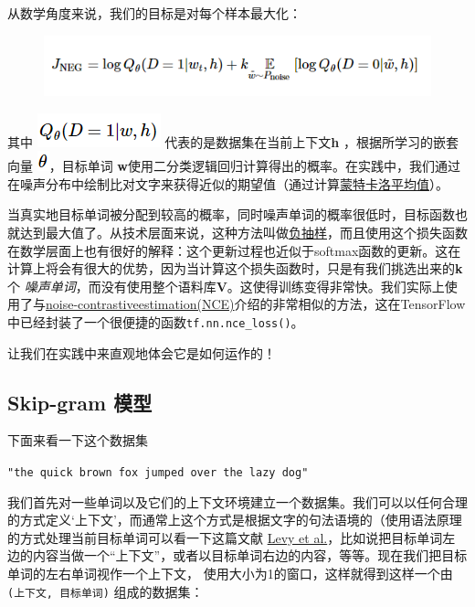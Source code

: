 从数学角度来说，我们的目标是对每个样本最大化：

\begin{figure}[htbp]
\centering
\includegraphics{../SOURCE/images/rw6.png}
\caption{}
\end{figure}

其中 \includegraphics{../SOURCE/images/rw7.png} 代表的是数据集在当前上下文\textbf{h} ，根据所学习的嵌套向量 \includegraphics{../SOURCE/images/theta.png}，目标单词 \textbf{w}使用二分类逻辑回归计算得出的概率。在实践中，我们通过在噪声分布中绘制比对文字来获得近似的期望值（通过计算\href{https://en.wikipedia.org/wiki/Monte_Carlo_integration}{蒙特卡洛平均值}）。

当真实地目标单词被分配到较高的概率，同时噪声单词的概率很低时，目标函数也就达到最大值了。从技术层面来说，这种方法叫做\href{http://papers.nips.cc/paper/5021-distributed-representations-of-words-and-phrases-and-their-compositionality.pdf}{负抽样}，而且使用这个损失函数在数学层面上也有很好的解释：这个更新过程也近似于softmax函数的更新。这在计算上将会有很大的优势，因为当计算这个损失函数时，只是有我们挑选出来的\textbf{k} 个 \emph{噪声单词}，而没有使用整个语料库\textbf{V}。这使得训练变得非常快。我们实际上使用了与\href{http://papers.nips.cc/paper/5165-learning-word-embeddings-efficiently-with-noise-contrastive-estimation.pdf}{noise-contrastiveestimation(NCE)}介绍的非常相似的方法，这在TensorFlow中已经封装了一个很便捷的函数\lstinline{tf.nn.nce_loss()}。

让我们在实践中来直观地体会它是如何运作的！

\subsection{Skip-gram 模型}\label{skip-gram_model}

下面来看一下这个数据集

\lstinline{"the quick brown fox jumped over the lazy dog"}

我们首先对一些单词以及它们的上下文环境建立一个数据集。我们可以以任何合理的方式定义`上下文'，而通常上这个方式是根据文字的句法语境的（使用语法原理的方式处理当前目标单词可以看一下这篇文献
\href{https://levyomer.files.wordpress.com/2014/04/dependency-based-word-embeddings-acl-2014.pdf}{Levy et al.}，比如说把目标单词左边的内容当做一个“上下文”，或者以目标单词右边的内容，等等。现在我们把目标单词的左右单词视作一个上下文，
使用大小为1的窗口，这样就得到这样一个由\texttt{(上下文,\ 目标单词)}
组成的数据集：

